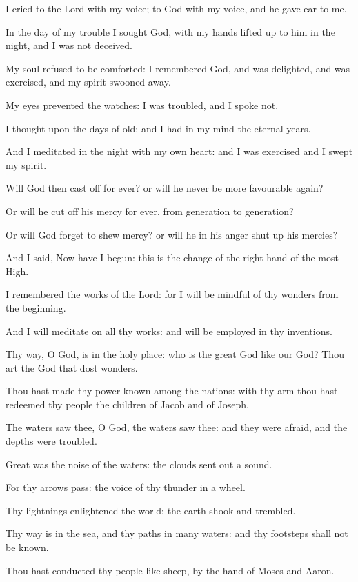 ﻿\item I cried to the Lord with my voice; to God with my voice, and he gave ear to me.
\item In the day of my trouble I sought God, with my hands lifted up to him in the night, and I was not deceived.
\item My soul refused to be comforted: I remembered God, and was delighted, and was exercised, and my spirit swooned away.
\item My eyes prevented the watches: I was troubled, and I spoke not.
\item I thought upon the days of old: and I had in my mind the eternal years.
\item And I meditated in the night with my own heart: and I was exercised and I swept my spirit.
\item Will God then cast off for ever? or will he never be more favourable again?
\item Or will he cut off his mercy for ever, from generation to generation?
\item Or will God forget to shew mercy? or will he in his anger shut up his mercies?
\item And I said, Now have I begun: this is the change of the right hand of the most High.
\item I remembered the works of the Lord: for I will be mindful of thy wonders from the beginning.
\item And I will meditate on all thy works: and will be employed in thy inventions.
\item Thy way, O God, is in the holy place: who is the great God like our God? Thou art the God that dost wonders.
\item Thou hast made thy power known among the nations: with thy arm thou hast redeemed thy people the children of Jacob and of Joseph.
\item The waters saw thee, O God, the waters saw thee: and they were afraid, and the depths were troubled.
\item Great was the noise of the waters: the clouds sent out a sound.
\item For thy arrows pass: the voice of thy thunder in a wheel.
\item Thy lightnings enlightened the world: the earth shook and trembled.
\item Thy way is in the sea, and thy paths in many waters: and thy footsteps shall not be known.
\item Thou hast conducted thy people like sheep, by the hand of Moses and Aaron.